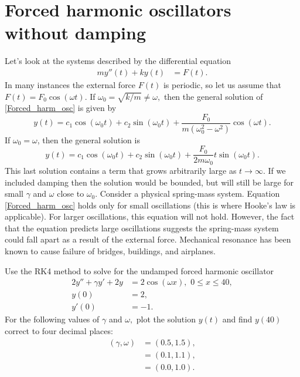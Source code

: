 \section*{Forced harmonic oscillators without damping}
Let's look at the systems described by the differential equation
\begin{align}
my''(t)  + ky(t) &= F(t). \label{Forced_harm_osc}
\end{align}
In many instances the external force $F(t)$ is periodic, so let us assume that $F(t) = F_0 \cos(\omega t)$. If $\omega_0 = \sqrt{k/m} \not = \omega,$ then the  general solution of \ref{Forced_harm_osc} is given by
\[y(t) = c_1 \cos (\omega_0 t) + c_2\sin (\omega_0 t) + \frac{F_0}{m(\omega_0^2 - \omega^2)} \cos (\omega t).\]
If $\omega_0 = \omega$, then the general solution is
\[y(t) = c_1 \cos (\omega_0 t) + c_2\sin (\omega_0 t) + \frac{F_0}{2m\omega_0} t \sin (\omega_0 t).\]
This last solution contains a term that grows arbitrarily large as $t \to \infty$.
If we included damping then the solution would be bounded, but will still be large for small $\gamma$ and $\omega$ close to $\omega_0$.
Consider a physical spring-mass system.
Equation \ref{Forced_harm_osc} holds only for small oscillations (this is where Hooke's law is applicable).
For larger oscillations, this equation will not hold.
However, the fact that the equation predicts large oscillations suggests the spring-mass system could fall apart as a result of the external force. Mechanical resonance has
been known to cause failure of bridges, buildings, and airplanes.

\begin{problem}
Use the RK4 method to solve for the undamped forced harmonic oscillator
\begin{align*}
2y'' + \gamma y' + 2y &= 2 \cos (\omega x), \,\, 0 \leq x \leq 40,\\
y(0) &= 2, \\
y'(0) &= -1.
\end{align*}
For the following values of $\gamma$ and $\omega,$ plot the solution $y(t)$ and find $y(40)$ correct to four decimal places:
\begin{align*}
	(\gamma, \omega) &= (0.5, 1.5),\\
	 &= (0.1, 1.1), \\
	&= (0.0, 1.0).
\end{align*}
\end{problem}

